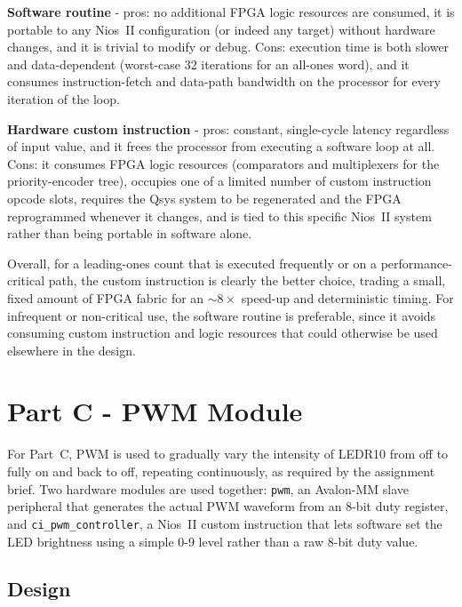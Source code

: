 \documentclass[
    12pt,
    a4paper
]{report}
\begin{document}
\textbf{Software routine} - pros: no additional FPGA logic resources are consumed, it is portable
to any Nios~II configuration (or indeed any target) without hardware changes, and it is trivial to
modify or debug. Cons: execution time is both slower and data-dependent (worst-case 32 iterations
for an all-ones word), and it consumes instruction-fetch and data-path bandwidth on the processor
for every iteration of the loop.

\textbf{Hardware custom instruction} - pros: constant, single-cycle latency regardless of input
value, and it frees the processor from executing a software loop at all. Cons: it consumes FPGA
logic resources (comparators and multiplexers for the priority-encoder tree), occupies one of a
limited number of custom instruction opcode slots, requires the Qsys system to be regenerated and
the FPGA reprogrammed whenever it changes, and is tied to this specific Nios~II system rather than
being portable in software alone.

Overall, for a leading-ones count that is executed frequently or on a performance-critical path,
the custom instruction is clearly the better choice, trading a small, fixed amount of FPGA fabric
for an $\sim\!8\times$ speed-up and deterministic timing. For infrequent or non-critical use, the
software routine is preferable, since it avoids consuming custom instruction and logic resources
that could otherwise be used elsewhere in the design.


\chapter{Part C - PWM Module}

For Part~C, PWM is used to gradually vary the intensity of LEDR10 from off to fully on and back to
off, repeating continuously, as required by the assignment brief. Two hardware modules are used
together: \texttt{pwm}, an Avalon-MM slave peripheral that generates the actual PWM waveform from
an 8-bit duty register, and \texttt{ci\_pwm\_controller}, a Nios~II custom instruction that lets
software set the LED brightness using a simple 0-9 level rather than a raw 8-bit duty value.

\section{Design}
\end{document}

